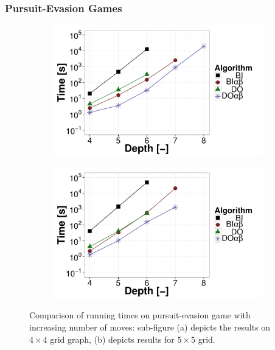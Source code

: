 \subsubsection{Pursuit-Evasion Games}
\begin{figure}
\centering
	\begin{subfigure}{0.49\textwidth}
		\includegraphics[width=1\textwidth]{figures/PEG4x4.pdf}\caption{}\label{fig:off:res:peg4}
	\end{subfigure}
	\begin{subfigure}{0.49\textwidth}
		\includegraphics[width=1\textwidth]{figures/PEG5x5.pdf}\caption{}\label{fig:off:res:peg5}
	\end{subfigure}
\caption{Comparison of running times on pursuit-evasion game with increasing number of moves: sub-figure (a) depicts the results on $4\times4$ grid graph, (b) depicts results for $5\times5$ grid.} \label{fig:off:res:peg}
\end{figure}

